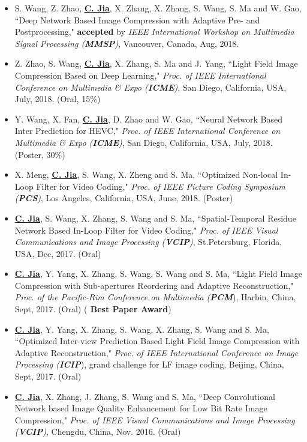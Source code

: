 \documentclass[margin, 10pt]{res} %
\begin{document}
\begin{resume}
\begin{itemize}
\item{S. Wang, Z. Zhao, \underline{\bf C. Jia}, X. Zhang, X. Zhang, S. Wang, S. Ma and W. Gao, ``Deep Network Based Image Compression with Adaptive Pre- and Postprocessing," {\bf accepted} by {\em IEEE International Workshop on Multimedia Signal Processing ({\bf MMSP})}, Vancouver, Canada, Aug, 2018. }

\item{Z. Zhao, S. Wang, \underline{\bf C. Jia}, X. Zhang, S. Ma and J. Yang, ``Light Field Image Compression Based on Deep Learning," {\em Proc. of IEEE International Conference on Multimedia \& Expo ({\bf ICME})}, San Diego, California, USA, July, 2018. (Oral, 15\%)}

\item{Y. Wang, X. Fan, \underline{\bf C. Jia}, D. Zhao and W. Gao, ``Neural Network Based Inter Prediction for HEVC," {\em Proc. of IEEE International Conference on Multimedia \& Expo ({\bf ICME})}, San Diego, California, USA, July, 2018. (Poster, 30\%)}

\item{X. Meng, \underline{\bf C. Jia}, S. Wang, X. Zheng and S. Ma, ``Optimized Non-local In-Loop Filter for Video Coding," {\em Proc. of IEEE Picture Coding Symposium ({\bf PCS})}, Los Angeles, California, USA, June, 2018. (Poster)}

\item{\underline{\bf C. Jia}, S. Wang, X. Zhang, S. Wang and S. Ma, ``Spatial-Temporal Residue Network Based In-Loop Filter for Video Coding," {\em Proc. of IEEE Visual Communications and Image Processing ({\bf VCIP})}, St.Petersburg, Florida, USA, Dec, 2017. (Oral)}

\item{\underline{\bf C. Jia}, Y. Yang, X. Zhang, S. Wang, S. Wang and S. Ma, ``Light Field Image Compression with Sub-apertures Reordering and Adaptive Reconstruction," {\em Proc. of the Pacific-Rim Conference on Multimedia ({\bf PCM}}), Harbin, China, Sept, 2017. (Oral)} ({\bf{\color{red} Best Paper Award}})

\item{\underline{\bf C. Jia}, Y. Yang, X. Zhang, S. Wang, X. Zhang, S. Wang and S. Ma, ``Optimized Inter-view Prediction Based Light Field Image Compression with Adaptive Reconstruction," {\em Proc. of IEEE International Conference on Image Processing ({\bf ICIP}}), grand challenge for LF image coding, Beijing, China, Sept, 2017. (Oral)}

\item{\underline{\bf C. Jia}, X. Zhang, J. Zhang, S. Wang and S. Ma, ``Deep Convolutional Network based Image Quality Enhancement for Low Bit Rate Image Compression," {\em Proc. of IEEE Visual Communications and Image Processing ({\bf VCIP})}, Chengdu, China, Nov. 2016. (Oral)}


\end{itemize}
\end{resume}
\end{document}

